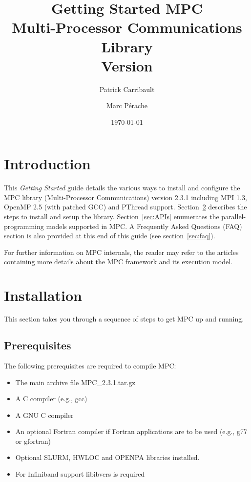\documentclass[a4paper,11pt]{article}
\title{Getting Started MPC\\Multi-Processor Communications Library\\Version {\MPCVERSION}}
\author{Patrick Carribault \and Marc P\'{e}rache}
\date{\today}
\def\MPCVERSION{2.3.1}
\begin{document}
\maketitle
\tableofcontents

\section{Introduction}

\paragraph{}
This \textit{Getting Started} guide details the various ways to install and configure the MPC library
(Multi-Processor Communications) version {\MPCVERSION} including MPI 1.3, OpenMP 2.5 (with patched GCC) and PThread support.
Section~\ref{sec:installation} describes the steps to install and setup the library.
Section~\ref{sec:APIs} enumerates the parallel-programming models supported in MPC.
A Frequently Asked Questions (FAQ) section is also provided at this end of this guide (see section~\ref{sec:faq}).

For further information on MPC internals, the reader may refer to the
articles~\cite{Perache08,Perache09,Carribault10} containing more details about the MPC
framework and its execution model.

\section{Installation}
\label{sec:installation}

This section takes you through a sequence of steps to get MPC up and running.

\subsection{Prerequisites}

The following prerequisites are required to compile MPC:
\begin{itemize}
    \item  The main archive file MPC\_{\MPCVERSION}.tar.gz

    \item  A C compiler (e.g., gcc)

    \item  A GNU C compiler

    \item  An optional Fortran compiler if Fortran applications are to be used
      (e.g., g77 or gfortran)

    \item  Optional SLURM, HWLOC and OPENPA libraries installed.

    \item  For Infiniband support libibvers is required
\end{itemize}
\end{document}
